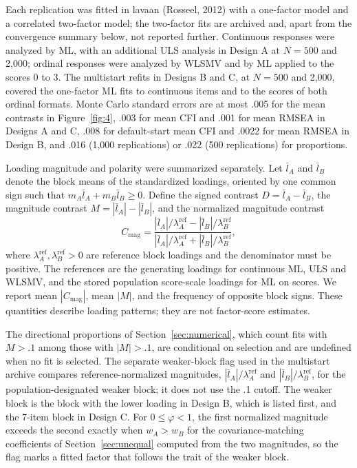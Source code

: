Each replication was fitted in lavaan (Rosseel, 2012) with a one-factor model and a correlated two-factor model; the two-factor fits are archived and, apart from the convergence summary below, not reported further. Continuous responses were analyzed by ML, with an additional ULS analysis in Design A at $N=500$ and 2,000; ordinal responses were analyzed by WLSMV and by ML applied to the scores 0 to 3. The multistart refits in Designs B and C, at $N=500$ and 2,000, covered the one-factor ML fits to continuous items and to the scores of both ordinal formats. Monte Carlo standard errors are at most .005 for the mean contrasts in Figure~\ref{fig:4}, .003 for mean CFI and .001 for mean RMSEA in Designs A and C, .008 for default-start mean CFI and .0022 for mean RMSEA in Design B, and .016 (1,000 replications) or .022 (500 replications) for proportions.

Loading magnitude and polarity were summarized separately. Let $\bar l_A$ and $\bar l_B$ denote the block means of the standardized loadings, oriented by one common sign such that $m_A\bar l_A+m_B\bar l_B\ge0$. Define the signed contrast $D=\bar l_A-\bar l_B$, the magnitude contrast $M=|\bar l_A|-|\bar l_B|$, and the normalized magnitude contrast
\[
C_{\mathrm{mag}}=\frac{|\bar l_A|/\lambda_A^{\mathrm{ref}}-|\bar l_B|/\lambda_B^{\mathrm{ref}}}{|\bar l_A|/\lambda_A^{\mathrm{ref}}+|\bar l_B|/\lambda_B^{\mathrm{ref}}},
\]
where $\lambda_A^{\mathrm{ref}},\lambda_B^{\mathrm{ref}}>0$ are reference block loadings and the denominator must be positive. The references are the generating loadings for continuous ML, ULS and WLSMV, and the stored population score-scale loadings for ML on scores. We report mean $|C_{\mathrm{mag}}|$, mean $|M|$, and the frequency of opposite block signs. These quantities describe loading patterns; they are not factor-score estimates.

The directional proportions of Section~\ref{sec:numerical}, which count fits with $M>.1$ among those with $|M|>.1$, are conditional on selection and are undefined when no fit is selected. The separate weaker-block flag used in the multistart archive compares reference-normalized magnitudes, $|\bar l_A|/\lambda_A^{\mathrm{ref}}$ and $|\bar l_B|/\lambda_B^{\mathrm{ref}}$, for the population-designated weaker block; it does not use the .1 cutoff. The weaker block is the block with the lower loading in Design B, which is listed first, and the 7-item block in Design C. For $0\le\varphi<1$, the first normalized magnitude exceeds the second exactly when $w_A>w_B$ for the covariance-matching coefficients of Section~\ref{sec:unequal} computed from the two magnitudes, so the flag marks a fitted factor that follows the trait of the weaker block.

